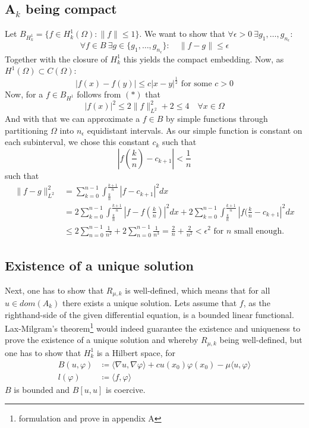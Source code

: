 \documentclass[14pt,a4paper]{scrartcl}
\numberwithin{equation}{section}
\begin{document}
\subsection{A$_{k}$ being compact}
Let $B_{H^{1}_{k}} = \{ f \in H^{1}_{k}(\Omega) : \| f \| \leq 1 \}$. We want to show that $\forall \epsilon > 0 ~\exists g_{1}, \dotsc, g_{n_{\epsilon}}$:
	\[ \forall f \in B ~\exists g \in \{ g_{1}, \dotsc, g_{n_{\epsilon}} \} : \quad \| f - g \| \leq \epsilon \]
Together with the closure of $H^{1}_{k}$ this yields the compact embedding. Now, as $H^1(\Omega) \subset C(\Omega)$: 
	\[ |f(x) - f(y)| \leq c |x - y|^{\frac{1}{2}} \text{ for some } c > 0 \tag*{$(*)$} \]
Now, for a $f \in B_{H^{1}}$ follows from $(*)$ that 
	\[ |f(x)|^{2} \leq 2 \| f \|^{2}_{L^{2}} + 2 \leq 4 \quad \forall x \in \Omega \]
And with that we can approximate a $f \in B$ by simple functions through partitioning $\Omega$ into $n_{\epsilon}$ equidistant intervals. As our simple function is constant on each subinterval, we chose this constant $c_{k}$ such that
	\[ |f(\frac{k}{n}) - c_{k + 1}| < \frac{1}{n}  \]
such that
\begin{align*}
	\| f - g \|^{2}_{L^{2}} & = \sum_{k = 0}^{n-1} \int_{\frac{k}{n}}^{\frac{k+1}{n}} | f - c_{k+1} |^{2} dx \\
		& =  2 \sum_{k = 0}^{n-1} \int_{\frac{k}{n}}^{\frac{k+1}{n}} | f - f(\frac{k}{n}) |^{2} dx +  2 \sum_{k = 0}^{n-1} \int_{\frac{k}{n}}^{\frac{k+1}{n}} | f(\frac{k}{n} - c_{k+1} |^{2} dx \\
		& \leq 2 \sum_{n = 0}^{n-1} \frac{1}{n^{2}} + 2 \sum_{n=0}^{n-1} \frac{1}{n^{3}} = \frac{2}{n} + \frac{2}{n^{2}} < \epsilon^{2} \text{ for } n \text{ small enough.}
\end{align*}

\newpage

\subsection{Existence of a unique solution}
Next, one has to show that $R_{\mu, k}$ is well-defined, which means that for all $u \in dom(A_{k})$ there exists a unique solution. Lets assume that $f$, as the righthand-side of the given differential equation, is a bounded linear functional. Lax-Milgram's theorem\footnote{formulation and prove in appendix A} would indeed guarantee the existence and uniqueness to prove the existence of a unique solution and whereby $R_{\mu, k}$ being well-defined, but one has to show that $H^{1}_{k}$ is a Hilbert space, for
\begin{align*}
	B(u, \varphi) & \coloneqq \langle \nabla u, \nabla \varphi \rangle + c u(x_{0}) \varphi(x_{0}) - \mu \langle u , \varphi \rangle \\ 
	l(\varphi) & \coloneqq \langle f, \varphi \rangle
\end{align*}  
$B$ is bounded and $B[u,u]$ is coercive.
\end{document}
